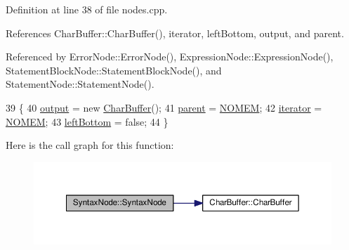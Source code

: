 Definition at line 38 of file nodes.\+cpp.



References Char\+Buffer\+::\+Char\+Buffer(), iterator, left\+Bottom, output, and parent.



Referenced by Error\+Node\+::\+Error\+Node(), Expression\+Node\+::\+Expression\+Node(), Statement\+Block\+Node\+::\+Statement\+Block\+Node(), and Statement\+Node\+::\+Statement\+Node().


\begin{DoxyCode}
39 \{
40     \hyperlink{classSyntaxNode_a1180628cbe3fce43930cee0df5a9ce5c}{output} = \textcolor{keyword}{new} \hyperlink{classCharBuffer}{CharBuffer}();
41     \hyperlink{classSyntaxNode_a890b17a9d4446c2d2aec4f6e4838e8bd}{parent} = \hyperlink{platform_8h_a46ff2bfbf0d44b8466a2251d5bd5e6f8}{NOMEM};
42     \hyperlink{classSyntaxNode_a9bd3349d05f33eaa271cca1805a86e1b}{iterator} = \hyperlink{platform_8h_a46ff2bfbf0d44b8466a2251d5bd5e6f8}{NOMEM};
43     \hyperlink{classSyntaxNode_ae0488f07ad7cc43143e44e89ec27bc40}{leftBottom} = \textcolor{keyword}{false};
44 \}
\end{DoxyCode}


Here is the call graph for this function\+:
\nopagebreak
\begin{figure}[H]
\begin{center}
\leavevmode
\includegraphics[width=350pt]{d8/d5d/classSyntaxNode_ac94372d402f38a118b4e8cd20ba7e520_cgraph}
\end{center}
\end{figure}




